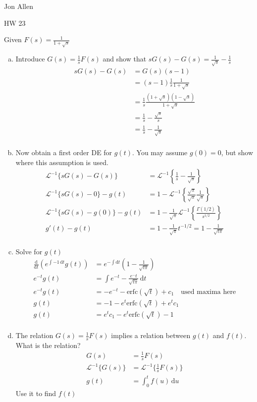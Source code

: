 \documentclass{article}
\begin{document}
Jon Allen

HW 23

Given $F(s)=\frac{1}{1+\sqrt{s}}$
\begin{enumerate}[(a)]
\item
Introduce $G(s)=\frac{1}{s}F(s)$ and show that $sG(s)-G(s)=\frac{1}{\sqrt{s}}-\frac{1}{s}$
\begin{align*}
  sG(s)-G(s)&=G(s)(s-1)\\
  &=(s-1)\frac{1}{s}\frac{1}{1+\sqrt{s}}\\
  &=\frac{1}{s}\frac{(1+\sqrt{s})(1-\sqrt{s})}{1+\sqrt{s}}\\
  &=\frac{1}{s}-\frac{\sqrt{s}}{s}\\
  &=\frac{1}{s}-\frac{1}{\sqrt{s}}\\
\end{align*}
\item
Now obtain a first order DE for $g(t)$. You may assume $g(0)=0$, but show where this assumption is used.
\begin{align*}
  \mathcal{L}^{-1}\{sG(s)-G(s)\}&=\mathcal{L}^{-1}\left\{\frac{1}{s}-\frac{1}{\sqrt{s}}\right\}\\
  \mathcal{L}^{-1}\{sG(s)-0\}-g(t)&=1-\mathcal{L}^{-1}\left\{\frac{\sqrt{\pi}}{\sqrt{\pi}}\frac{1}{\sqrt{s}}\right\}\\
  \mathcal{L}^{-1}\{sG(s)-g(0)\}-g(t)&=1-\frac{1}{\sqrt{\pi}}\mathcal{L}^{-1}\left\{\frac{\Gamma(1/2)}{s^{1/2}}\right\}\\
  g'(t)-g(t)&=1-\frac{1}{\sqrt{\pi}}t^{-1/2}=1-\frac{1}{\sqrt{t\pi}}\\
\end{align*}
\item
Solve for $g(t)$
\begin{align*}
  \frac{\mathrm{d}}{\mathrm{d}t}\left(e^{\int{-1\,\mathrm{d}t}}g(t)\right)&=e^{-\int{\mathrm{d}t}}\left(1-\frac{1}{\sqrt{t\pi}}\right)\\
  e^{-t}g(t)&=\int{e^{-t}-\frac{e^-t}{\sqrt{t\pi}}\,\mathrm{d}t}\\
  e^{-t}g(t)&=-e^{-t}-\text{erfc}(\sqrt{t})+c_1\quad\text{used maxima here}\\
  g(t)&=-1-e^{t}\text{erfc}(\sqrt{t})+e^tc_1\\
  g(t)&=e^tc_1-e^{t}\text{erfc}(\sqrt{t})-1\\
\end{align*}
\item
The relation $G(s)=\frac{1}{s}F(s)$ implies a relation between $g(t)$ and $f(t)$. What is the relation?
\begin{align*}
  G(s)&=\frac{1}{s}F(s)\\
  \mathcal{L}^{-1}\{G(s)\}&=\mathcal{L}^{-1}\{\frac{1}{s}F(s)\}\\
  g(t)&=\int_0^t{f(u)\,\mathrm{d}u}
\end{align*}
Use it to find $f(t)$
\end{enumerate}
\end{document}
